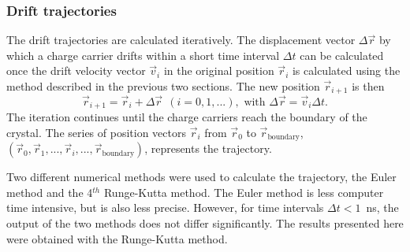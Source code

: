 \documentclass[epj]{svjour}
\begin{document}
\subsubsection{Drift trajectories} 
\label{s:trj} 
The drift trajectories are calculated iteratively. The displacement
vector $\Delta \vec{r}$ by which a charge carrier drifts within a
short time interval $\Delta t$ can be calculated once the drift
velocity vector $\vec{v}_{i}$ in the original position $\vec{r}_{i}$
is calculated using the method described in the previous two sections.
The new position $\vec{r}_{i+1}$ is then
\begin{equation} 
\label{e:pos} 
\vec{r}_{i+1} = \vec{r}_{i} + \Delta \vec{r} \ \ 
(i=0,1,...), \mbox{ with } 
\Delta \vec{r} = \vec{v}_{i} \Delta t. 
\end{equation} 
The iteration continues until the charge carriers reach the boundary
of the crystal. The series of position vectors $\vec{r}_{i}$ from
$\vec{r}_{0}$ to $\vec{r}_{\mbox{boundary}}$, $(\vec{r}_{0},
\vec{r}_{1}, ..., \vec{r}_{i}, ...,
\vec{r}_{\mbox{boundary}})$, represents the trajectory.
 
Two different numerical methods were used to calculate the trajectory,
the Euler method and the 4$^{th}$ Runge-Kutta method.  The Euler
method is less computer time intensive, but is also less precise.
However, for time intervals $\Delta t < 1$~ns, the output of the two
methods does not differ significantly.  The results presented here
were obtained with the Runge-Kutta method.
 
\end{document}
